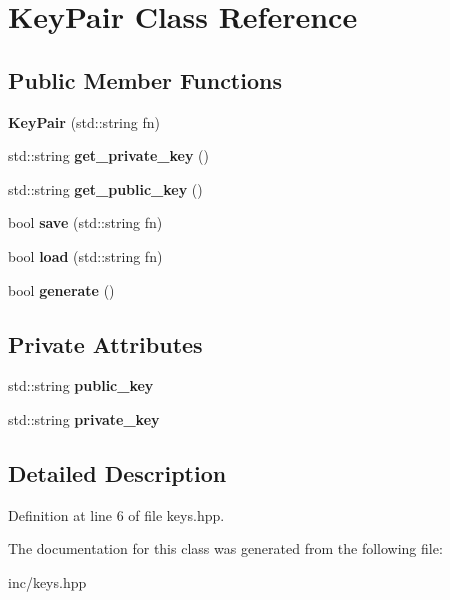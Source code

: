 \hypertarget{classKeyPair}{}\section{Key\+Pair Class Reference}
\label{classKeyPair}
\subsection*{Public Member Functions}
\begin{DoxyCompactItemize}
\item 
{\bfseries Key\+Pair} (std\+::string fn)\hypertarget{classKeyPair_abb76e1352cd09330bcb427db9427d0fe}{}\label{classKeyPair_abb76e1352cd09330bcb427db9427d0fe}

\item 
std\+::string {\bfseries get\+\_\+private\+\_\+key} ()\hypertarget{classKeyPair_aed3f501d1309995513c869a97dc7fe65}{}\label{classKeyPair_aed3f501d1309995513c869a97dc7fe65}

\item 
std\+::string {\bfseries get\+\_\+public\+\_\+key} ()\hypertarget{classKeyPair_a8c2ee218561f276670bac9042671883e}{}\label{classKeyPair_a8c2ee218561f276670bac9042671883e}

\item 
bool {\bfseries save} (std\+::string fn)\hypertarget{classKeyPair_a9bba268aef4d7c936d3dd181209cc781}{}\label{classKeyPair_a9bba268aef4d7c936d3dd181209cc781}

\item 
bool {\bfseries load} (std\+::string fn)\hypertarget{classKeyPair_a32d3f5c3dbb65631d88e2e1adfd19293}{}\label{classKeyPair_a32d3f5c3dbb65631d88e2e1adfd19293}

\item 
bool {\bfseries generate} ()\hypertarget{classKeyPair_a0d73c5cf28b839eaee85afd5fa0f1360}{}\label{classKeyPair_a0d73c5cf28b839eaee85afd5fa0f1360}

\end{DoxyCompactItemize}
\subsection*{Private Attributes}
\begin{DoxyCompactItemize}
\item 
std\+::string {\bfseries public\+\_\+key}\hypertarget{classKeyPair_a1687f83143f8cfee9259611b0500a1ef}{}\label{classKeyPair_a1687f83143f8cfee9259611b0500a1ef}

\item 
std\+::string {\bfseries private\+\_\+key}\hypertarget{classKeyPair_a906b420b06f8d8d7822ba3803501aed3}{}\label{classKeyPair_a906b420b06f8d8d7822ba3803501aed3}

\end{DoxyCompactItemize}


\subsection{Detailed Description}


Definition at line 6 of file keys.\+hpp.



The documentation for this class was generated from the following file\+:\begin{DoxyCompactItemize}
\item 
inc/keys.\+hpp\end{DoxyCompactItemize}
